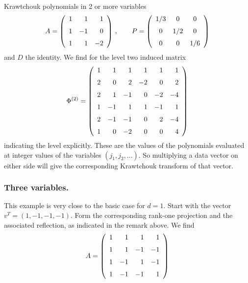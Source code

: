 \documentclass[runningheads]{llncs}
\begin{document}
\begin{section}{Krawtchouk polynomials in 2 or more variables}
$$A= \left( \begin {array}{rrr} 1&1&1\\\noalign{\medskip}1&-1&0
\\\noalign{\medskip}1&1&-2\end {array} \right) \,,\qquad
P= \left( \begin {array}{ccc} 1/3&0&0\\\noalign{\medskip}0&1/2&0
\\\noalign{\medskip}0&0&1/6\end {array} \right) $$
and $D$ the identity. We find for the level two induced matrix
$$\Phi^{(2)}=\left( \begin {array}{rrrrrr} 1&1&1&1&1&1\\\noalign{\medskip}2&0&2&-2
&0&2\\\noalign{\medskip}2&1&-1&0&-2&-4\\\noalign{\medskip}1&-1&1&1&-1&
1\\\noalign{\medskip}2&-1&-1&0&2&-4\\\noalign{\medskip}1&0&-2&0&0&4
\end {array} \right)$$
indicating the level explicitly. These are the values of the polynomials evaluated at integer values of the variables $(j_1,j_2,\ldots)$.
So multiplying a data vector on either side will give the corresponding Krawtchouk transform of that vector.
\subsubsection{Three variables. }
This example is very close to the basic case for $d=1$. Start with the vector $v^T=(1,-1,-1,-1)$. Form the corresponding
rank-one projection and the associated reflection, as indicated in the remark above. We find
$$A= \left( \begin {array}{rrrr} 1&1&1&1\\\noalign{\medskip}1&1&-1&-1
\\\noalign{\medskip}1&-1&1&-1\\\noalign{\medskip}1&-1&-1&1\end {array} \right)$$


\end{section}
\end{document}
